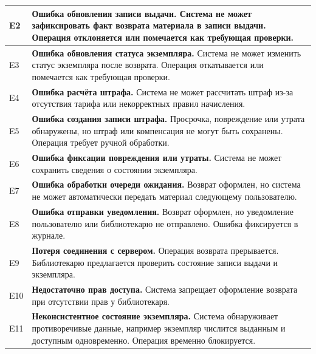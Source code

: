 \documentclass[12pt,a4paper]{article}
\begin{document}
\begin{xltabular}{\textwidth}{
				|>{\raggedright\arraybackslash}p{2.7cm}
				|>{\raggedright\arraybackslash}X|
			}
			E2 &
			\textbf{Ошибка обновления записи выдачи.}
			Система не может зафиксировать факт возврата материала в записи
			выдачи. Операция отклоняется или помечается как требующая проверки. \\
			\hline
			
			E3 &
			\textbf{Ошибка обновления статуса экземпляра.}
			Система не может изменить статус экземпляра после возврата. Операция
			откатывается или помечается как требующая проверки. \\
			\hline
			
			E4 &
			\textbf{Ошибка расчёта штрафа.}
			Система не может рассчитать штраф из-за отсутствия тарифа или
			некорректных правил начисления. \\
			\hline
			
			E5 &
			\textbf{Ошибка создания записи штрафа.}
			Просрочка, повреждение или утрата обнаружены, но штраф или
			компенсация не могут быть сохранены. Операция требует ручной
			обработки. \\
			\hline
			
			E6 &
			\textbf{Ошибка фиксации повреждения или утраты.}
			Система не может сохранить сведения о состоянии экземпляра. \\
			\hline
			
			E7 &
			\textbf{Ошибка обработки очереди ожидания.}
			Возврат оформлен, но система не может автоматически передать материал
			следующему пользователю. \\
			\hline
			
			E8 &
			\textbf{Ошибка отправки уведомления.}
			Возврат оформлен, но уведомление пользователю или библиотекарю не
			отправлено. Ошибка фиксируется в журнале. \\
			\hline
			
			E9 &
			\textbf{Потеря соединения с сервером.}
			Операция возврата прерывается. Библиотекарю предлагается проверить
			состояние записи выдачи и экземпляра. \\
			\hline
			
			E10 &
			\textbf{Недостаточно прав доступа.}
			Система запрещает оформление возврата при отсутствии прав у
			библиотекаря. \\
			\hline
			
			E11 &
			\textbf{Неконсистентное состояние экземпляра.}
			Система обнаруживает противоречивые данные, например экземпляр
			числится выданным и доступным одновременно. Операция временно
			блокируется. \\
			\hline
			

\end{xltabular}
\end{document}
